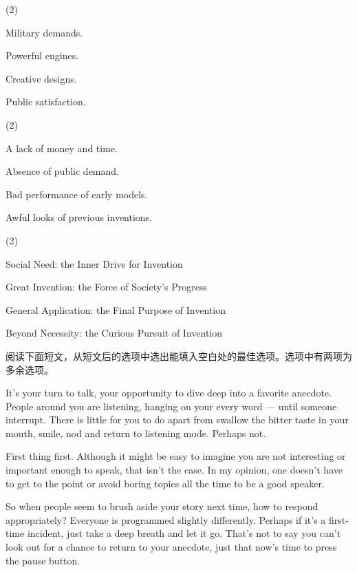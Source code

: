 \documentclass{英语试卷}
\begin{document}
\begin{choices}(2)
  \item Military demands.
  \item Powerful engines.
  \item Creative designs.
  \item Public satisfaction.
\end{choices}
\begin{choices}(2)
  \item A lack of money and time.
  \item Absence of public demand.
  \item Bad performance of early models.
  \item Awful looks of previous inventions.
\end{choices}
\begin{choices}(2)
  \item Social Need: the Inner Drive for Invention
  \item Great Invention: the Force of Society's Progress
  \item General Application: the Final Purpose of Invention
  \item Beyond Necessity: the Curious Pursuit of Invention
\end{choices}
\par 阅读下面短文，从短文后的选项中选出能填入空白处的最佳选项。选项中有两项为多余选项。\par
\par It's your turn to talk, your opportunity to dive deep into a favorite anecdote. People around you are listening, hanging on your every word — until someone interrupt. There is little for you to do apart from swallow the bitter taste in your mouth, smile, nod and return to listening mode.  Perhaps not.\par
\par First thing first. Although it might be easy to imagine you are not interesting or important enough to speak, that isn't the case. In my opinion, one doesn't have to get to the point or avoid boring topics all the time to be a good speaker. \par
\par So when people seem to brush aside your story next time, how to respond appropriately?  Everyone is programmed slightly differently. Perhaps if it's a first-time incident, just take a deep breath and let it go. That's not to say you can't look out for a chance to return to your anecdote, just that now's time to press the pause button.\par
\end{document}
